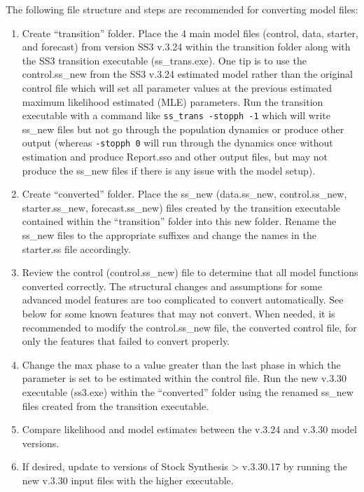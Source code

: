 The following file structure and steps are recommended for converting model files:
\begin{enumerate}
	\item Create ``transition'' folder.  Place the 4 main model files (control, data, starter, and forecast) from version SS3 v.3.24 within the transition folder along with the SS3 transition executable (ss\_trans.exe).  One tip is to use the control.ss\_new from the SS3 v.3.24 estimated model rather than the original control file which will set all parameter values at the previous estimated maximum likelihood estimated (MLE) parameters.  Run the transition executable with a command like \texttt{ss\_trans -stopph -1} which will write ss\_new files but not go through the population dynamics or produce other output (whereas \texttt{-stopph 0} will run through the dynamics once without estimation and produce Report.sso and other output files, but may not produce the ss\_new files if there is any issue with the model setup).
	
	\item Create ``converted'' folder.  Place the ss\_new (data.ss\_new, control.ss\_new, starter.ss\_new, forecast.ss\_new) files created by the transition executable contained within the ``transition'' folder into this new folder.  Rename the ss\_new files to the appropriate suffixes and change the names in the starter.ss file accordingly.
	
	\item Review the control (control.ss\_new) file to determine that all model functions converted correctly.  The structural changes and assumptions for some advanced model features are too complicated to convert automatically.  See below for some known features that may not convert. When needed, it is recommended to modify the control.ss\_new file, the converted control file, for only the features that failed to convert properly.
	
	\item Change the max phase to a value greater than the last phase in which the parameter is set to be estimated within the control file.  Run the new v.3.30 executable (ss3.exe) within the ``converted'' folder using the renamed ss\_new files created from the transition executable.
	
	\item Compare likelihood and model estimates between the v.3.24 and v.3.30 model versions.
	
	\item If desired, update to versions of Stock Synthesis > v.3.30.17 by running the new v.3.30 input files with the higher executable.
\end{enumerate}

